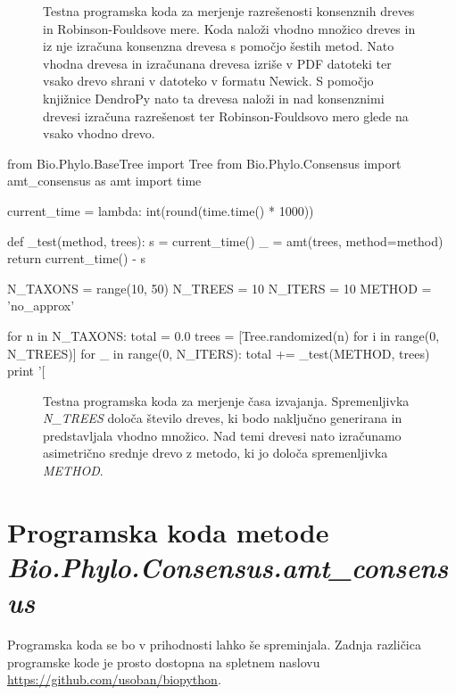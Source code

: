 \documentclass[a4paper, 12pt]{book}
\begin{document}
\begin{figure}[h!]
	\label{app-code-metrics}
	\footnotesize
	{
	\caption{
		Testna programska koda za merjenje razrešenosti konsenznih dreves 
		in Robinson-Fouldsove mere. Koda naloži vhodno množico dreves 
		in iz nje izračuna konsenzna drevesa s pomočjo šestih metod. 
		Nato vhodna drevesa in izračunana drevesa izriše v PDF datoteki 
		ter vsako drevo shrani v datoteko v formatu Newick. S pomočjo 
		knjižnice DendroPy nato ta drevesa naloži in nad konsenznimi drevesi 
		izračuna razrešenost ter Robinson-Fouldsovo mero glede na 
		vsako vhodno drevo.
	}
	}
\end{figure}
\clearpage
\begin{python}
from Bio.Phylo.BaseTree import Tree
from Bio.Phylo.Consensus import amt_consensus as amt
import time

current_time = lambda: int(round(time.time() * 1000))


def _test(method, trees):
    s = current_time()
    _ = amt(trees, method=method)
    return current_time() - s

N_TAXONS = range(10, 50)
N_TREES = 10
N_ITERS = 10
METHOD = 'no_approx'

for n in N_TAXONS:
    total = 0.0
    trees = [Tree.randomized(n) for i in range(0, N_TREES)]
    for _ in range(0, N_ITERS):
        total += _test(METHOD, trees)
    print '[%
\end{python}
\begin{figure}[h!]
	\label{app-code-time}
	\footnotesize
	{
	\caption{
		Testna programska koda za merjenje časa izvajanja. Spremenljivka 
		{\it N\_TREES} določa število dreves, ki bodo naključno generirana 
		in predstavljala vhodno množico. Nad temi drevesi nato izračunamo 
		asimetrično srednje drevo z metodo, ki jo določa spremenljivka {\it METHOD}.  
	}
	}
\end{figure}

\chapter{Programska koda metode {\it Bio.Phylo.Consensus.amt\_consensus}\label{appendix-code-amt_consensus}}

Programska koda se bo v prihodnosti lahko še spreminjala. Zadnja različica programske
kode je prosto dostopna na spletnem naslovu \url{https://github.com/usoban/biopython}.
\end{document}
